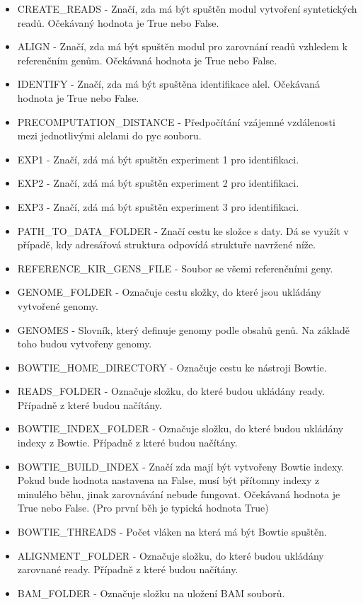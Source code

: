 \documentclass[czech,DP]{thesiskiv}
\numberwithin{equation}{section}
\begin{document}
\begin{itemize}
	\item CREATE\_READS - Značí, zda má být spuštěn modul vytvoření syntetických readů. Očekávaný hodnota je True nebo False.
	\item ALIGN - Značí, zda má být spuštěn modul pro zarovnání readů vzhledem k referenčním genům. Očekávaná hodnota je True nebo False.
	\item IDENTIFY - Značí, zda má být spuštěna identifikace alel. Očekávaná hodnota je True nebo False.
	\item PRECOMPUTATION\_DISTANCE - Předpočítání vzájemné vzdálenosti mezi jednotlivými alelami do pyc souboru. 
	\item EXP1 - Značí, zdá má být spuštěn experiment 1 pro identifikaci.
	\item EXP2 - Značí, zdá má být spuštěn experiment 2 pro identifikaci.
	\item EXP3 - Značí, zdá má být spuštěn experiment 3 pro identifikaci.
	\item PATH\_TO\_DATA\_FOLDER - Značí cestu ke složce s daty. Dá se využít v případě, kdy adresářová struktura odpovídá struktuře navržené níže.
	\item REFERENCE\_KIR\_GENS\_FILE - Soubor se všemi referenčními geny. 
	\item GENOME\_FOLDER - Označuje cestu složky, do které jsou ukládány vytvořené genomy. 
	\item GENOMES - Slovník, který definuje genomy podle obsahů genů. Na základě toho budou vytvořeny genomy.
	\item BOWTIE\_HOME\_DIRECTORY - Označuje cestu ke nástroji Bowtie.
	\item READS\_FOLDER - Označuje složku, do které budou ukládány ready. Případně z které budou načítány.
	\item BOWTIE\_INDEX\_FOLDER - Označuje složku, do které budou ukládány indexy z Bowtie. Případně z které budou načítány. 
	\item BOWTIE\_BUILD\_INDEX - Značí zda mají být vytvořeny Bowtie indexy. Pokud bude hodnota nastavena na False, musí být přítomny indexy z minulého běhu, jinak zarovnávání nebude fungovat. Očekávaná hodnota je True nebo False. (Pro první běh je typická hodnota True)
	\item BOWTIE\_THREADS - Počet vláken na která má být Bowtie spuštěn.	
	\item ALIGNMENT\_FOLDER - Označuje složku, do které budou ukládány zarovnané ready. Případně z které budou načítány. 
	\item BAM\_FOLDER - Označuje složku na uložení BAM souborů.  

\end{itemize}
\end{document}
